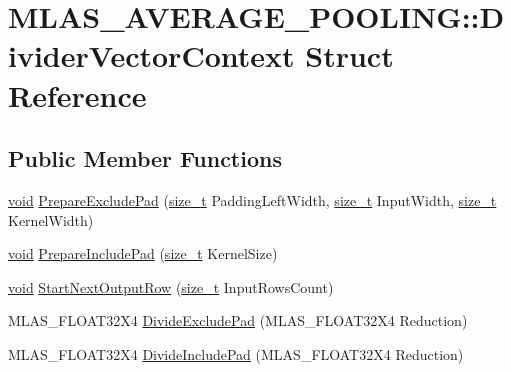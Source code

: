 \hypertarget{structMLAS__AVERAGE__POOLING_1_1DividerVectorContext}{}\section{M\+L\+A\+S\+\_\+\+A\+V\+E\+R\+A\+G\+E\+\_\+\+P\+O\+O\+L\+I\+NG\+:\+:Divider\+Vector\+Context Struct Reference}
\label{structMLAS__AVERAGE__POOLING_1_1DividerVectorContext}
\subsection*{Public Member Functions}
\begin{DoxyCompactItemize}
\item 
\mbox{\hyperlink{mlasi_8h_a88f941d423cb2a819b70a1358982b1a6}{void}} \mbox{\hyperlink{structMLAS__AVERAGE__POOLING_1_1DividerVectorContext_a73f240bb4b605de259fb38130f40e0f6}{Prepare\+Exclude\+Pad}} (\mbox{\hyperlink{mlasi_8h_a503efbc1c6e50825320ad909366b78ab}{size\+\_\+t}} Padding\+Left\+Width, \mbox{\hyperlink{mlasi_8h_a503efbc1c6e50825320ad909366b78ab}{size\+\_\+t}} Input\+Width, \mbox{\hyperlink{mlasi_8h_a503efbc1c6e50825320ad909366b78ab}{size\+\_\+t}} Kernel\+Width)
\item 
\mbox{\hyperlink{mlasi_8h_a88f941d423cb2a819b70a1358982b1a6}{void}} \mbox{\hyperlink{structMLAS__AVERAGE__POOLING_1_1DividerVectorContext_ad717c3e102ff0a0ac054d2d8e2935185}{Prepare\+Include\+Pad}} (\mbox{\hyperlink{mlasi_8h_a503efbc1c6e50825320ad909366b78ab}{size\+\_\+t}} Kernel\+Size)
\item 
\mbox{\hyperlink{mlasi_8h_a88f941d423cb2a819b70a1358982b1a6}{void}} \mbox{\hyperlink{structMLAS__AVERAGE__POOLING_1_1DividerVectorContext_adac379ef6ecf2a0b3b7f5e9e093de639}{Start\+Next\+Output\+Row}} (\mbox{\hyperlink{mlasi_8h_a503efbc1c6e50825320ad909366b78ab}{size\+\_\+t}} Input\+Rows\+Count)
\item 
M\+L\+A\+S\+\_\+\+F\+L\+O\+A\+T32\+X4 \mbox{\hyperlink{structMLAS__AVERAGE__POOLING_1_1DividerVectorContext_af84617d659675316dd60a216b7cd1225}{Divide\+Exclude\+Pad}} (M\+L\+A\+S\+\_\+\+F\+L\+O\+A\+T32\+X4 Reduction)
\item 
M\+L\+A\+S\+\_\+\+F\+L\+O\+A\+T32\+X4 \mbox{\hyperlink{structMLAS__AVERAGE__POOLING_1_1DividerVectorContext_a873a56aeba812c540815cc3c220b726f}{Divide\+Include\+Pad}} (M\+L\+A\+S\+\_\+\+F\+L\+O\+A\+T32\+X4 Reduction)
\end{DoxyCompactItemize}
